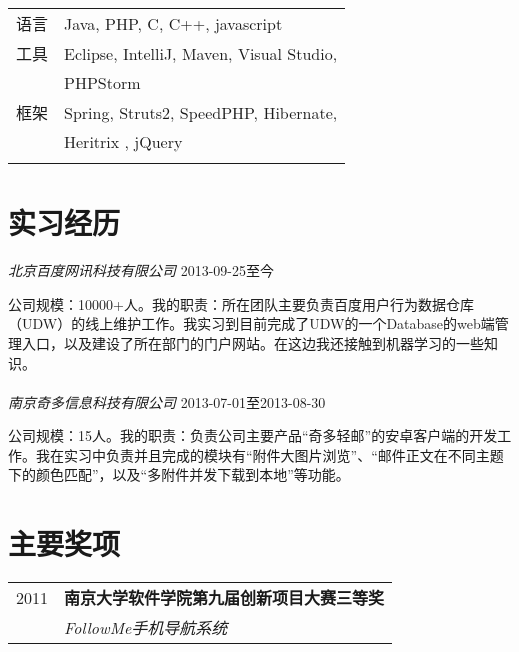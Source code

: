 \documentclass[10pt]{article} %
\begin{document}
{\begin{minipage}[t]{0.44\textwidth}
\begin{tabular}{rl}
语言
& Java, PHP, C, C++, javascript\\ 
工具
& Eclipse, IntelliJ, Maven, Visual Studio,\\
& PHPStorm\\
框架
& Spring, Struts2, SpeedPHP, Hibernate,\\
& Heritrix , jQuery\\
& \\ 
\end{tabular}

\section{实习经历} 


{\large \textit{北京百度网讯科技有限公司}} \hfill  \hfill {\textsc{2013-09-25至今}}

\normalsize{公司规模：10000+人。我的职责：所在团队主要负责百度用户行为数据仓库（UDW）的线上维护工作。我实习到目前完成了UDW的一个Database的web端管理入口，以及建设了所在部门的门户网站。在这边我还接触到机器学习的一些知识。}\\\\
{\large \textit{南京奇多信息科技有限公司}} \hfill  \hfill {\textsc{2013-07-01至2013-08-30}}

\normalsize{公司规模：15人。我的职责：负责公司主要产品“奇多轻邮”的安卓客户端的开发工作。我在实习中负责并且完成的模块有“附件大图片浏览”、“邮件正文在不同主题下的颜色匹配”，以及“多附件并发下载到本地”等功能。}\\ 


\section{主要奖项} 

\begin{tabular}{rl}

2011	 & \textbf{南京大学软件学院第九届创新项目大赛三等奖}\\
& \textit{FollowMe手机导航系统}\\ 



\end{tabular}
\end{minipage}}
\end{document}

